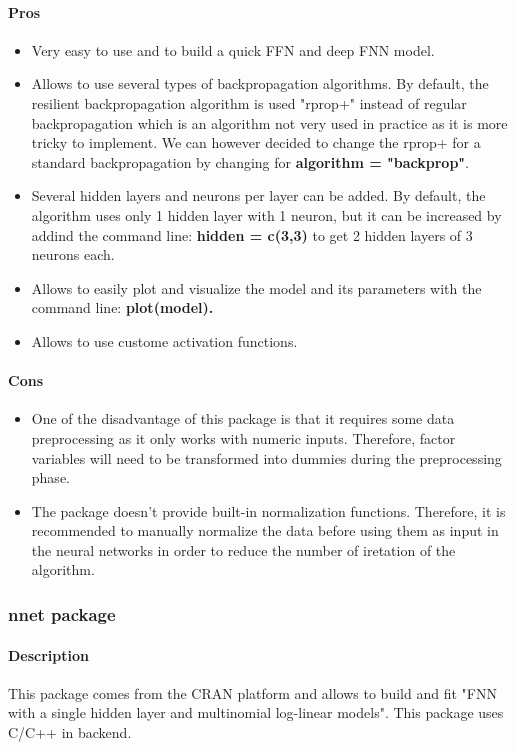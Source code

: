 \documentclass[letter]{article}\usepackage[]{graphicx}\usepackage[]{color}
\begin{document}
\paragraph{Pros}
\begin{itemize}
\item Very easy to use and to build a quick FFN and deep FNN model.
\item Allows to use several types of backpropagation algorithms. By default, the resilient backpropagation algorithm is used "rprop+" instead of regular backpropagation which is an algorithm not very used in practice as it is more tricky to implement. We can however decided to change the rprop+ for a standard backpropagation by changing for \textbf{algorithm = "backprop"}.
\item Several hidden layers and neurons per layer can be added. By default, the algorithm uses only 1 hidden layer with 1 neuron, but it can be increased by addind the command line: \textbf{hidden = c(3,3)} to get 2 hidden layers of 3 neurons each.
\item Allows to easily plot and visualize the model and its parameters with the command line: \textbf{plot(model).}
\item Allows to use custome activation functions.
\end{itemize}
\paragraph{Cons}
\begin{itemize}
\item One of the disadvantage of this package is that it requires some data preprocessing as it only works with numeric inputs. Therefore, factor variables will need to be transformed into dummies during the preprocessing phase. 
\item The package doesn't provide built-in normalization functions. Therefore, it is recommended to manually normalize the data before using them as input in the neural networks in order to reduce the number of iretation of the algorithm.
\end{itemize}

\subsubsection{\textbf{nnet package}}
\paragraph{Description}
This package comes from the CRAN platform and allows to build and fit "FNN with a single hidden layer and multinomial log-linear models". This package uses C/C++ in backend.
\end{document}
